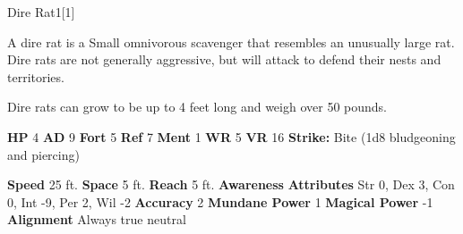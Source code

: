   
  \begin{monsection}{Dire Rat}{1}[1]
    \vspace{-1em}\vspace{-1em}
    \vspace{0em}

    
        A dire rat is a Small omnivorous scavenger that resembles an unusually large rat.
        Dire rats are not generally aggressive, but will attack to defend their nests and territories.
      
        Dire rats can grow to be up to 4 feet long and weigh over 50 pounds.
      

    \begin{spellcontent}
      \begin{spelltargetinginfo}
        \pari \textbf{HP} 4 \monsep
          \textbf{AD} 9 \monsep
          \textbf{Fort} 5 \monsep
          \textbf{Ref} 7 \monsep
          \textbf{Ment} 1
        \pari \textbf{WR} 5 \monsep
        \textbf{VR} 16
        \pari \textbf{Strike:}
            Bite  (1d8 bludgeoning and piercing)
      \end{spelltargetinginfo}
    \end{spellcontent}
    \begin{monsterfooter}
      \pari \textbf{Speed} 25 ft. \monsep
        \textbf{Space} 5 ft. \monsep
        \textbf{Reach} 5 ft.
      \pari \textbf{Awareness} 
      \pari \textbf{Attributes}
        Str 0, Dex 3,
        Con 0, Int -9,
        Per 2, Wil -2
      \pari \textbf{Accuracy} 2 \monsep
        \textbf{Mundane Power} 1 \monsep
      \textbf{Magical Power} -1
      \pari \textbf{Alignment} Always true neutral
    \end{monsterfooter}
  \end{monsection}
  
